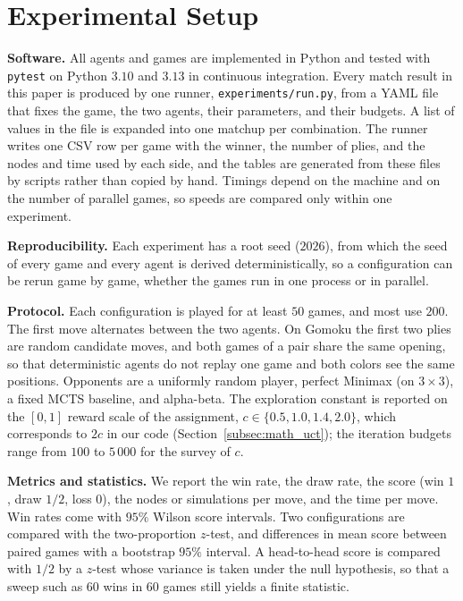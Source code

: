 \section{Experimental Setup}
\label{sec:experimental_setup}

\textbf{Software.} All agents and games are implemented in Python and tested with \texttt{pytest} on Python $3.10$ and $3.13$ in continuous integration. Every match result in this paper is produced by one runner, \texttt{experiments/run.py}, from a YAML file that fixes the game, the two agents, their parameters, and their budgets. A list of values in the file is expanded into one matchup per combination. The runner writes one CSV row per game with the winner, the number of plies, and the nodes and time used by each side, and the tables are generated from these files by scripts rather than copied by hand. Timings depend on the machine and on the number of parallel games, so speeds are compared only within one experiment.

\textbf{Reproducibility.} Each experiment has a root seed ($2026$), from which the seed of every game and every agent is derived deterministically, so a configuration can be rerun game by game, whether the games run in one process or in parallel.

\textbf{Protocol.} Each configuration is played for at least $50$ games, and most use $200$. The first move alternates between the two agents. On Gomoku the first two plies are random candidate moves, and both games of a pair share the same opening, so that deterministic agents do not replay one game and both colors see the same positions. Opponents are a uniformly random player, perfect Minimax (on $3\times 3$), a fixed MCTS baseline, and alpha-beta. The exploration constant is reported on the $[0, 1]$ reward scale of the assignment, $c \in \{0.5, 1.0, 1.4, 2.0\}$, which corresponds to $2c$ in our code (Section~\ref{subsec:math_uct}); the iteration budgets range from $100$ to $5\,000$ for the survey of $c$.

\textbf{Metrics and statistics.} We report the win rate, the draw rate, the score (win $1$, draw $1/2$, loss $0$), the nodes or simulations per move, and the time per move. Win rates come with $95\%$ Wilson score intervals. Two configurations are compared with the two-proportion $z$-test, and differences in mean score between paired games with a bootstrap $95\%$ interval. A head-to-head score is compared with $1/2$ by a $z$-test whose variance is taken under the null hypothesis, so that a sweep such as $60$ wins in $60$ games still yields a finite statistic.
